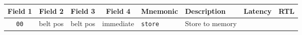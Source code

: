 \documentclass{article}
\begin{document}
\begin{landscape}

	\begin{longtable}{c c c c l l r l}
		Field 1 & Field 2 & Field 3 & Field 4 & Mnemonic & Description & Latency & RTL \\
		\midrule
		\texttt{00} & belt pos & belt pos & immediate & \texttt{store} & Store to memory \\


\end{longtable}
\end{landscape}
\end{document}
